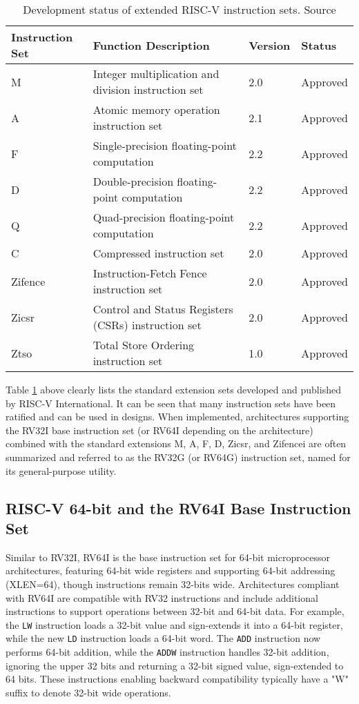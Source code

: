 \begin{table}[h!]
    \centering
    \caption{Development status of extended RISC-V instruction sets. Source \cite{waterman2014riscv}}
    \label{tab:extension_status}
    \begin{tabular}{llll}
    \toprule
    \textbf{Instruction Set} & \textbf{Function Description} & \textbf{Version} & \textbf{Status} \\
    \midrule
    M & Integer multiplication and division instruction set & 2.0 & Approved \\
    A & Atomic memory operation instruction set & 2.1 & Approved \\
    F & Single-precision floating-point computation & 2.2 & Approved \\
    D & Double-precision floating-point computation & 2.2 & Approved \\
    Q & Quad-precision floating-point computation & 2.2 & Approved \\
    C & Compressed instruction set & 2.0 & Approved \\
    Zifence & Instruction-Fetch Fence instruction set & 2.0 & Approved \\
    Zicsr & Control and Status Registers (CSRs) instruction set & 2.0 & Approved \\
    Ztso & Total Store Ordering instruction set & 1.0 & Approved \\
    \bottomrule
    \end{tabular}
\end{table}

Table \ref{tab:extension_status} above clearly lists the standard extension sets developed and published by RISC-V International. It can be seen that many instruction sets have been ratified and can be used in designs. When implemented, architectures supporting the RV32I base instruction set (or RV64I depending on the architecture) combined with the standard extensions M, A, F, D, Zicsr, and Zifencei are often summarized and referred to as the RV32G (or RV64G) instruction set, named for its general-purpose utility.

\subsection{RISC-V 64-bit and the RV64I Base Instruction Set}

Similar to RV32I, RV64I is the base instruction set for 64-bit microprocessor architectures, featuring 64-bit wide registers and supporting 64-bit addressing (XLEN=64), though instructions remain 32-bits wide. Architectures compliant with RV64I are compatible with RV32 instructions and include additional instructions to support operations between 32-bit and 64-bit data. For example, the \texttt{LW} instruction loads a 32-bit value and sign-extends it into a 64-bit register, while the new \texttt{LD} instruction loads a 64-bit word. The \texttt{ADD} instruction now performs 64-bit addition, while the \texttt{ADDW} instruction handles 32-bit addition, ignoring the upper 32 bits and returning a 32-bit signed value, sign-extended to 64 bits. These instructions enabling backward compatibility typically have a "W" suffix to denote 32-bit wide operations.

